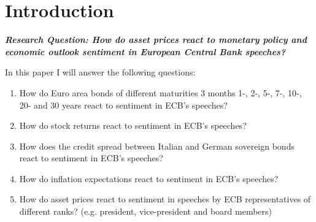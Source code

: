 \section{Introduction}




\textbf{\textit{Research Question: How do asset prices react to monetary policy and economic outlook sentiment in European Central Bank speeches?}}


In this paper I will answer the following questions: 
\begin{enumerate}
  \item How do Euro area bonds of different maturities 3 months 1-, 2-, 5-, 7-, 10-, 20- and 30 years react to sentiment in ECB’s speeches?
  \item How do stock returns react to sentiment in ECB’s speeches?
  \item How does the credit spread between Italian and German sovereign bonds react to sentiment in ECB’s speeches?
  \item How do inflation expectations react to sentiment in ECB’s speeches?
  \item How do asset prices react to sentiment in speeches by ECB representatives of different ranks? (e.g. president, vice-president and board members)
\end{enumerate}